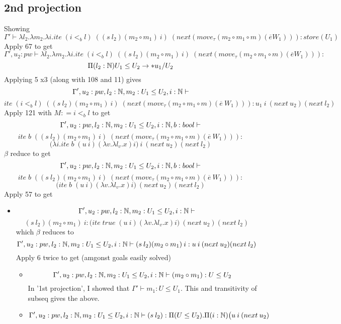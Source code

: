 \message{ !name(paper.tex)}\documentclass{article}
\begin{document}
\begin{itemize}
\begin{itemize}
    \subsection*{2nd projection}
    Showing 
    \[\Gamma' \vdash \lambda l_2. \lambda m_2. \lambda i. ite \; (i <_b l) \;
((s \: l_2) (m_2 \circ m_1)\: i) \; (next
(move_{\tau}(m_2 \circ m_1 \circ m) 
(\overline{e} W_1))) :store(U_1)\]
Apply 67 to get
\[\Gamma', u_2: pw \vdash \lambda l_2. \lambda m_2. \lambda i. ite \; (i <_b l) \;
((s \: l_2) (m_2 \circ m_1)\: i) \; (next
(move_{\tau}(m_2 \circ m_1 \circ m) 
(\overline{e} W_1))) :\]
\[\Pi(l_2 : \mathbb{N})U_1 \leq U_2 \rightarrow *u_1/ U_2
\]
Applying 5 x3 (along with 108 and 11)
gives 
\[\Gamma', u_2: pw, l_2: \mathbb{N}, m_2:U_1 \leq U_2, i : \mathbb{N}  \vdash\] \[ ite \; (i <_b l) \;
((s \: l_2) (m_2 \circ m_1)\: i) \; (next
(move_{\tau}(m_2 \circ m_1 \circ m) 
(\overline{e}\: W_1))) : u_1 \: i \: (next \: u_2)
(next \: l_2)
\]
Apply 121 with $M : = i<_b l$ to get  
\[\Gamma', u_2: pw, l_2: \mathbb{N}, m_2:U_1 \leq U_2, i : \mathbb{N}, b: bool  \vdash\] \[ ite \; b \;
((s \: l_2) (m_2 \circ m_1)\: i) \; (next
(move_{\tau}(m_2 \circ m_1 \circ m) 
(\overline{e}\: W_1))) :\]
\[\Big( \lambda i. ite \; b\; (u\:i)(\lambda v. \lambda l_v. x) i \Big)\: i \: (next \: u_2)
(next \: l_2)
\]
$\beta$ reduce to get
\[\Gamma', u_2: pw, l_2: \mathbb{N}, m_2:U_1 \leq U_2, i : \mathbb{N}, b: bool  \vdash\] \[ ite \; b \;
((s \: l_2) (m_2 \circ m_1)\: i) \; (next
(move_{\tau}(m_2 \circ m_1 \circ m) 
(\overline{e}\: W_1))) :\]
\[ \Big( ite \; b\; (u\:i)(\lambda v. \lambda l_v. x) i \Big) \: (next \: u_2)
(next \: l_2)
\]
Apply 57 to get
\begin{itemize}
    \item
      \[\Gamma', u_2: pw, l_2: \mathbb{N}, m_2:U_1 \leq U_2, i : \mathbb{N} \vdash\] \[(s \: l_2) (m_2 \circ m_1) \: i :\Big( ite \; true\; (u\:i)(\lambda v. \lambda l_v. x) i \Big) \: (next \: u_2)
(next \: l_2)
\]
    which $\beta$ reduces to 
    \[\Gamma', u_2: pw, l_2: \mathbb{N}, m_2:U_1 \leq U_2, i : \mathbb{N} \vdash (s \: l_2) (m_2 \circ m_1)\:i  :u \: i \: (next \: u_2)
(next \: l_2)
\]
Apply 6 twice to get (amgonst goals easily solved)
\begin{itemize}
    \item  \[\Gamma', u_2: pw, l_2: \mathbb{N}, m_2:U_1 \leq U_2, i : \mathbb{N} \vdash (m_2 \circ m_1): U \leq U_2
\]
In '1st projection', I showed that $\Gamma' \vdash m_1 : U \leq U_1$. This and transitivity of subseq gives the above.
\item \[\Gamma', u_2: pw, l_2: \mathbb{N}, m_2:U_1 \leq U_2, i : \mathbb{N} \vdash (s \: l_2) : \Pi(U \leq U_2). \Pi(i: \mathbb{N})\big(u \: i \: (next \: u_2)
\]
\end{itemize}
\end{itemize}
\end{itemize}
\end{itemize}
\end{document}
